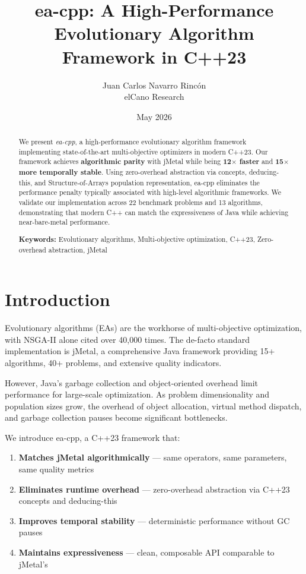\documentclass[10pt,a4paper]{article}
\title{ea-cpp: A High-Performance Evolutionary Algorithm Framework in C++23}
\author{Juan Carlos Navarro Rincón \\ elCano Research}
\date{May 2026}
\begin{document}
\maketitle

\begin{abstract}
We present \textit{ea-cpp}, a high-performance evolutionary algorithm framework implementing state-of-the-art multi-objective optimizers in modern C++23. Our framework achieves \textbf{algorithmic parity} with jMetal while being \textbf{12$\times$ faster} and \textbf{15$\times$ more temporally stable}. Using zero-overhead abstraction via concepts, deducing-this, and Structure-of-Arrays population representation, ea-cpp eliminates the performance penalty typically associated with high-level algorithmic frameworks. We validate our implementation across 22 benchmark problems and 13 algorithms, demonstrating that modern C++ can match the expressiveness of Java while achieving near-bare-metal performance.

\textbf{Keywords:} Evolutionary algorithms, Multi-objective optimization, C++23, Zero-overhead abstraction, jMetal
\end{abstract}

\section{Introduction}

Evolutionary algorithms (EAs) are the workhorse of multi-objective optimization, with NSGA-II alone cited over 40,000 times. The de-facto standard implementation is jMetal, a comprehensive Java framework providing 15+ algorithms, 40+ problems, and extensive quality indicators.

However, Java's garbage collection and object-oriented overhead limit performance for large-scale optimization. As problem dimensionality and population sizes grow, the overhead of object allocation, virtual method dispatch, and garbage collection pauses become significant bottlenecks.

We introduce ea-cpp, a C++23 framework that:
\begin{enumerate}
    \item \textbf{Matches jMetal algorithmically} --- same operators, same parameters, same quality metrics
    \item \textbf{Eliminates runtime overhead} --- zero-overhead abstraction via C++23 concepts and deducing-this
    \item \textbf{Improves temporal stability} --- deterministic performance without GC pauses
    \item \textbf{Maintains expressiveness} --- clean, composable API comparable to jMetal's
\end{enumerate}
\end{document}
